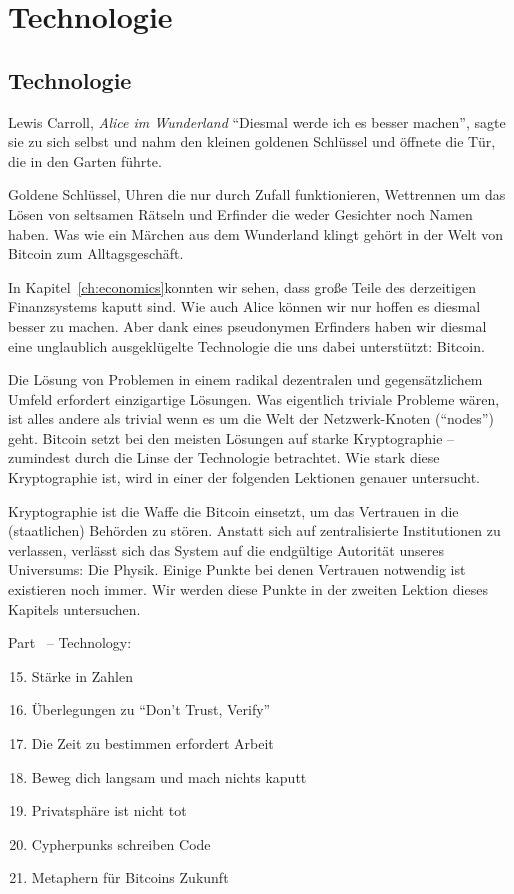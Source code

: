 \part{Technologie}
\label{ch:technology}
\chapter*{Technologie}

\begin{chapquote}{Lewis Carroll, \textit{Alice im Wunderland}}
\enquote{Diesmal werde ich es besser machen}, sagte sie zu sich selbst und nahm
den kleinen goldenen Schlüssel und öffnete die Tür, die in den Garten führte.
\end{chapquote}

Goldene Schlüssel, Uhren die nur durch Zufall funktionieren, Wettrennen um das
Lösen von seltsamen Rätseln und Erfinder die weder Gesichter noch Namen haben.
Was wie ein Märchen aus dem Wunderland klingt gehört in der Welt von Bitcoin zum
Alltagsgeschäft.

In Kapitel~\ref{ch:economics}konnten wir sehen, dass große Teile des derzeitigen
Finanzsystems kaputt sind. Wie auch Alice können wir nur hoffen es diesmal
besser zu machen. Aber dank eines pseudonymen Erfinders haben wir diesmal eine
unglaublich ausgeklügelte Technologie die uns dabei unterstützt: Bitcoin.

Die Lösung von Problemen in einem radikal dezentralen und gegensätzlichem Umfeld
erfordert einzigartige Lösungen. Was eigentlich triviale Probleme wären, ist
alles andere als trivial wenn es um die Welt der Netzwerk-Knoten (“nodes”) geht.
Bitcoin setzt bei den meisten Lösungen auf starke Kryptographie – zumindest
durch die Linse der Technologie betrachtet. Wie stark diese Kryptographie ist,
wird in einer der folgenden Lektionen genauer untersucht.

Kryptographie ist die Waffe die Bitcoin einsetzt, um das Vertrauen in die
(staatlichen) Behörden zu stören. Anstatt sich auf zentralisierte Institutionen
zu verlassen, verlässt sich das System auf die endgültige Autorität unseres
Universums: Die Physik. Einige Punkte bei denen Vertrauen notwendig ist
existieren noch immer. Wir werden diese Punkte in der zweiten Lektion dieses
Kapitels untersuchen.
~

\begin{samepage}
Part~\ref{ch:technology} -- Technology:

\begin{enumerate}
  \setcounter{enumi}{14}
  \item Stärke in Zahlen
  \item Überlegungen zu \enquote{Don't Trust, Verify}
  \item Die Zeit zu bestimmen erfordert Arbeit
  \item Beweg dich langsam und mach nichts kaputt
  \item Privatsphäre ist nicht tot
  \item Cypherpunks schreiben Code
  \item Metaphern für Bitcoins Zukunft
\end{enumerate}
\end{samepage}

